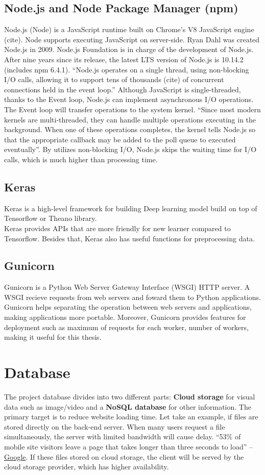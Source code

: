 \subsection{Node.js and Node Package Manager (npm)}
Node.js (Node) is a JavaScript runtime built on Chrome's V8 JavaScript engine (cite). Node supports executing JavaScript on server-side. Ryan Dahl was created Node.js in 2009. Node.js Foundation is in charge of the development of Node.js. After nine years since its release, the latest LTS version of Node.js is 10.14.2 (includes npm 6.4.1). “Node.js operates on a single thread, using non-blocking I/O calls, allowing it to support tens of thousands (cite) of concurrent connections held in the event loop.” Although JavaScript is single-threaded, thanks to the Event loop, Node.js can implement asynchronous I/O operations. The Event loop will transfer operations to the system kernel. “Since most modern kernels are multi-threaded, they can handle multiple operations executing in the background. When one of these operations completes, the kernel tells Node.js so that the appropriate callback may be added to the poll queue to executed eventually”. By utilizes non-blocking I/O, Node.js skips the waiting time for I/O calls, which is much higher than processing time.
\subsection{Keras}
Keras is a high-level framework for building Deep learning model build on top of Tensorflow or Theano library.\\
Keras provides APIs that are more friendly for new learner compared to Tensorflow. Besides that, Keras also has useful functions for preprocessing data.
\subsection{Gunicorn}
Gunicorn is a Python Web Server Gateway Interface (WSGI) HTTP server. A WSGI recieve requests from web servers and foward them to Python applications.
Gunicorn helps separating the operation between web servers and applications, making applications more portable. Moreover, Gunicorn provides features for deployment such as maximum of requests for each worker, number of workers, making it useful for this thesis.

\section{Database}
The project database divides into two different parts: \textbf{Cloud storage} for visual data such as image/video and a \textbf{NoSQL database} for other information. The primary target is to reduce website loading time. Let take an example, if files are stored directly on the back-end server. When many users request a file simultaneously, the server with limited bandwidth will cause delay. “53\% of mobile site visitors leave a page that takes longer than three seconds to load” – \href{https://think.storage.googleapis.com/docs/mobile-page-speed-new-industry-benchmarks.pdf}{Google}. If these files stored on cloud storage, the client will be served by the cloud storage provider, which has higher availability.
